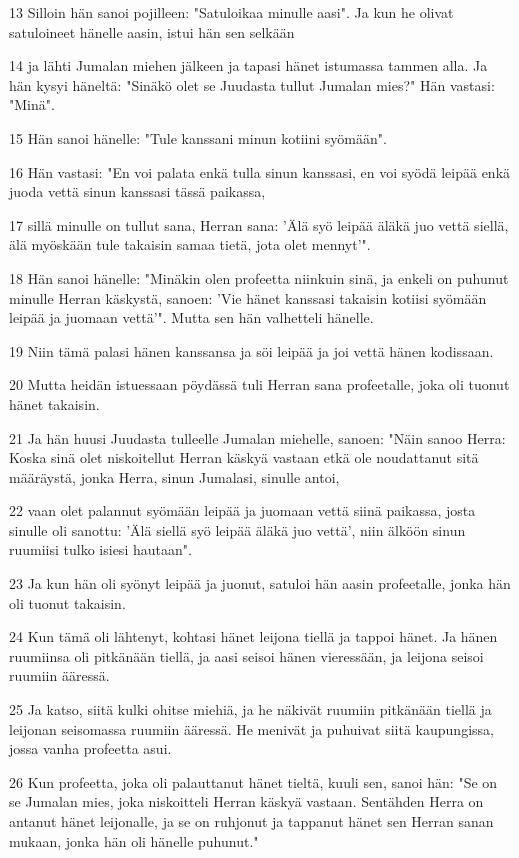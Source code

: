 \par 13 Silloin hän sanoi pojilleen: "Satuloikaa minulle aasi". Ja kun he olivat satuloineet hänelle aasin, istui hän sen selkään
\par 14 ja lähti Jumalan miehen jälkeen ja tapasi hänet istumassa tammen alla. Ja hän kysyi häneltä: "Sinäkö olet se Juudasta tullut Jumalan mies?" Hän vastasi: "Minä".
\par 15 Hän sanoi hänelle: "Tule kanssani minun kotiini syömään".
\par 16 Hän vastasi: "En voi palata enkä tulla sinun kanssasi, en voi syödä leipää enkä juoda vettä sinun kanssasi tässä paikassa,
\par 17 sillä minulle on tullut sana, Herran sana: 'Älä syö leipää äläkä juo vettä siellä, älä myöskään tule takaisin samaa tietä, jota olet mennyt'".
\par 18 Hän sanoi hänelle: "Minäkin olen profeetta niinkuin sinä, ja enkeli on puhunut minulle Herran käskystä, sanoen: 'Vie hänet kanssasi takaisin kotiisi syömään leipää ja juomaan vettä'". Mutta sen hän valhetteli hänelle.
\par 19 Niin tämä palasi hänen kanssansa ja söi leipää ja joi vettä hänen kodissaan.
\par 20 Mutta heidän istuessaan pöydässä tuli Herran sana profeetalle, joka oli tuonut hänet takaisin.
\par 21 Ja hän huusi Juudasta tulleelle Jumalan miehelle, sanoen: "Näin sanoo Herra: Koska sinä olet niskoitellut Herran käskyä vastaan etkä ole noudattanut sitä määräystä, jonka Herra, sinun Jumalasi, sinulle antoi,
\par 22 vaan olet palannut syömään leipää ja juomaan vettä siinä paikassa, josta sinulle oli sanottu: 'Älä siellä syö leipää äläkä juo vettä', niin älköön sinun ruumiisi tulko isiesi hautaan".
\par 23 Ja kun hän oli syönyt leipää ja juonut, satuloi hän aasin profeetalle, jonka hän oli tuonut takaisin.
\par 24 Kun tämä oli lähtenyt, kohtasi hänet leijona tiellä ja tappoi hänet. Ja hänen ruumiinsa oli pitkänään tiellä, ja aasi seisoi hänen vieressään, ja leijona seisoi ruumiin ääressä.
\par 25 Ja katso, siitä kulki ohitse miehiä, ja he näkivät ruumiin pitkänään tiellä ja leijonan seisomassa ruumiin ääressä. He menivät ja puhuivat siitä kaupungissa, jossa vanha profeetta asui.
\par 26 Kun profeetta, joka oli palauttanut hänet tieltä, kuuli sen, sanoi hän: "Se on se Jumalan mies, joka niskoitteli Herran käskyä vastaan. Sentähden Herra on antanut hänet leijonalle, ja se on ruhjonut ja tappanut hänet sen Herran sanan mukaan, jonka hän oli hänelle puhunut."

